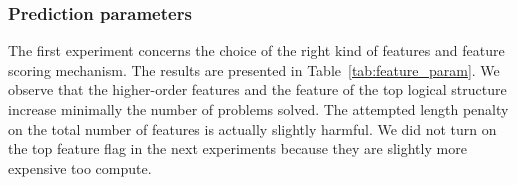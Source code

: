 \documentclass[runningheads,a4paper,draft]{svjour3}
\newcommand{\ra}[1]{\renewcommand{\arraystretch}{#1}}
\begin{document}
\subsubsection{Prediction parameters}
The first experiment concerns the choice of the right kind of features and 
feature scoring 
mechanism. The results are presented in Table~\ref{tab:feature_param}.
We observe that the higher-order features and the feature of the top logical 
structure increase minimally the number of problems solved. The attempted 
length penalty on the total number of features is actually slightly harmful.
We did not turn on the top feature flag in the next experiments because they 
are slightly more expensive too compute.

%
%
%
\end{document}
